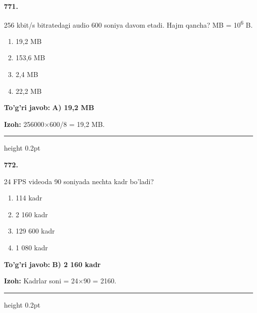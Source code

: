 \documentclass[10pt,a4paper,oneside]{article}
\begin{document}
\noindent\textbf{\color{ink}771.}
\par
256 kbit/s bitratedagi audio 600 soniya davom etadi. Hajm qancha? MB = 10\textsuperscript{6} B.
\begin{enumerate}[label=\Alph*),leftmargin=9mm]
\item 19,2 MB
\item 153,6 MB
\item 2,4 MB
\item 22,2 MB
\end{enumerate}
\begin{tcolorbox}[enhanced,breakable,colback=teal!4,colframe=teal!50!black,boxrule=0.5pt,arc=1.1mm,left=3mm,right=3mm,top=1.7mm,bottom=1.7mm,before skip=2mm,after skip=2mm]
\textbf{\color{teal}To'g'ri javob:} \textbf{A) 19,2 MB}
\par\smallskip
\textbf{Izoh:} 256000\ensuremath{\times}600/8 = 19,2 MB.
\end{tcolorbox}
\vspace{2mm}\hrule height 0.2pt \vspace{3mm}

\noindent\textbf{\color{ink}772.}
\par
24 FPS videoda 90 soniyada nechta kadr bo'ladi?
\begin{enumerate}[label=\Alph*),leftmargin=9mm]
\item 114 kadr
\item 2 160 kadr
\item 129 600 kadr
\item 1 080 kadr
\end{enumerate}
\begin{tcolorbox}[enhanced,breakable,colback=teal!4,colframe=teal!50!black,boxrule=0.5pt,arc=1.1mm,left=3mm,right=3mm,top=1.7mm,bottom=1.7mm,before skip=2mm,after skip=2mm]
\textbf{\color{teal}To'g'ri javob:} \textbf{B) 2 160 kadr}
\par\smallskip
\textbf{Izoh:} Kadrlar soni = 24\ensuremath{\times}90 = 2160.
\end{tcolorbox}
\vspace{2mm}\hrule height 0.2pt \vspace{3mm}
\end{document}
